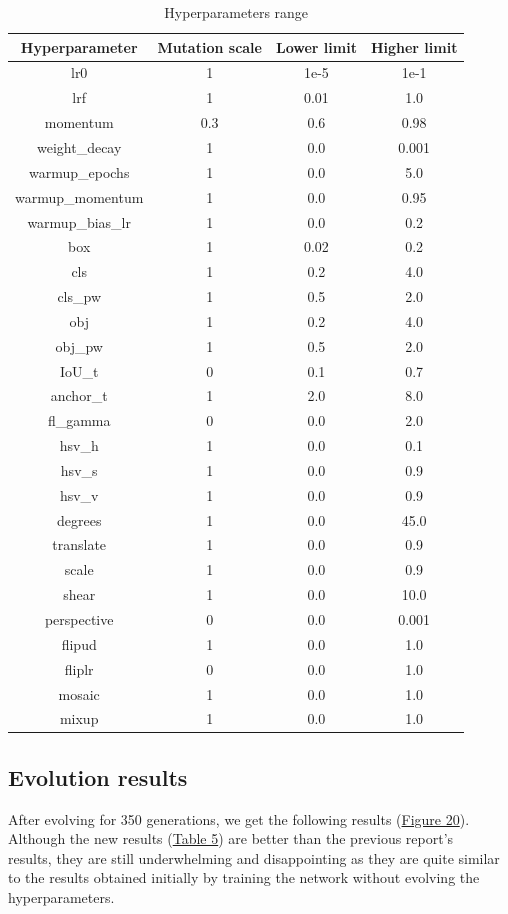 \documentclass{article}
\begin{document}
\begin{table}[h!]
\centering
\begin{tabular}{|c|c|c|c|} 
 \hline
 Hyperparameter &  Mutation scale & Lower limit & Higher limit \\ [0.5ex] 
 \hline\hline
 lr0 & 1& 1e-5& 1e-1  \\ 
 lrf& 1& 0.01& 1.0 \\ 
 momentum & 0.3& 0.6& 0.98 \\ 
 weight\_decay &1& 0.0& 0.001 \\ 
 warmup\_epochs &1& 0.0& 5.0 \\ 
 warmup\_momentum & 1& 0.0& 0.95 \\ 
 warmup\_bias\_lr & 1& 0.0& 0.2 \\ 
 box & 1& 0.02& 0.2 \\ 
 cls & 1& 0.2& 4.0 \\ 
 cls\_pw & 1& 0.5& 2.0 \\ 
 obj&1& 0.2& 4.0 \\ 
 obj\_pw&1& 0.5& 2.0 \\ 
 IoU\_t&0& 0.1& 0.7 \\ 
 anchor\_t&1& 2.0& 8.0 \\ 
 fl\_gamma&0& 0.0& 2.0 \\ 
 hsv\_h&1& 0.0& 0.1 \\ 
 hsv\_s&1& 0.0& 0.9 \\ 
 hsv\_v&1& 0.0& 0.9 \\ 
 degrees&1& 0.0& 45.0 \\ 
 translate&1& 0.0& 0.9 \\ 
 scale&1& 0.0& 0.9 \\ 
 shear&1& 0.0& 10.0 \\ 
 perspective&0& 0.0& 0.001 \\ 
 flipud&1& 0.0& 1.0 \\ 
 fliplr&0& 0.0& 1.0 \\
 mosaic&1& 0.0& 1.0 \\ 
 mixup&1& 0.0& 1.0 \\ [1ex] 
 \hline
\end{tabular}
\caption{Hyperparameters range}
\label{Table 4}
\end{table}

\subsection{Evolution results}

After evolving for 350 generations, we get the following results (\hyperref[Figure 20]{Figure 20}). Although the new results (\hyperref[Table 5]{Table 5}) are better than the previous report's ~\cite{stefano} results, they are still underwhelming and disappointing as they are quite similar to the results obtained initially by training the network without evolving the hyperparameters.
\end{document}
